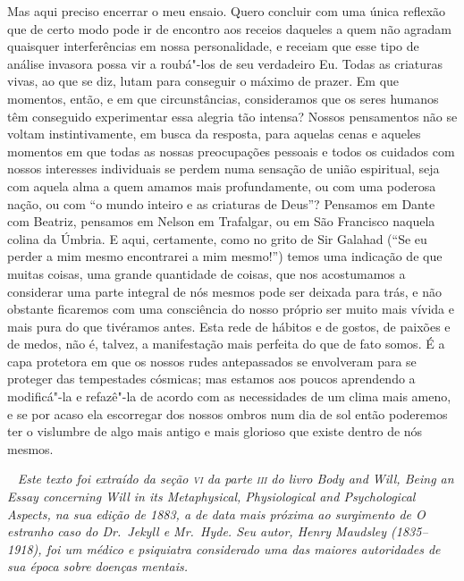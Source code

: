 Mas aqui preciso encerrar o meu ensaio.  Quero concluir com uma única
reflexão que de certo modo pode ir de encontro aos receios daqueles a
quem não agradam quaisquer interferências em nossa personalidade, e
receiam que esse tipo de análise invasora possa vir a roubá"-los de seu
verdadeiro Eu.  Todas as criaturas vivas, ao que se diz, lutam para
conseguir o máximo de prazer.  Em que momentos, então, e em que
circunstâncias, consideramos que os seres humanos têm conseguido
experimentar essa alegria tão intensa? Nossos pensamentos não se voltam
instintivamente, em busca da resposta, para aquelas cenas e aqueles
momentos em que todas as nossas preocupações pessoais e todos os
cuidados com nossos interesses individuais se perdem numa sensação de
união espiritual, seja com aquela alma a quem amamos mais
profundamente, ou com uma poderosa nação, ou com “o mundo inteiro e as
criaturas de Deus”?  Pensamos em Dante com Beatriz, pensamos em Nelson
em Trafalgar, ou em São Francisco naquela colina da Úmbria. E aqui,
certamente, como no grito de Sir Galahad (“Se eu perder a mim mesmo
encontrarei a mim mesmo!”) temos uma indicação de que muitas coisas,
uma grande quantidade de coisas, que nos acostumamos a considerar uma
parte integral de nós mesmos pode ser deixada para trás, e não obstante
ficaremos com uma consciência do nosso próprio ser muito mais vívida e
mais pura do que tivéramos antes.  Esta rede de hábitos e de gostos, de
paixões e de medos, não é, talvez, a manifestação mais perfeita do que
de fato somos.  É a capa protetora em que os nossos rudes antepassados
se envolveram para se proteger das tempestades cósmicas; mas estamos
aos poucos aprendendo a modificá"-la e refazê"-la de acordo com as
necessidades de um clima mais ameno, e se por acaso ela escorregar dos
nossos ombros num dia de sol então poderemos ter o vislumbre de algo
mais antigo e mais glorioso que existe dentro de nós mesmos. 




\clearpage
\ifodd\thepage ~ \clearpage\else\relax\fi
\thispagestyle{empty}
\mbox{}\vfill
{\noindent\itshape Este texto foi extraído da seção \emph{\textsc{vi}} da parte 
\emph{\textsc{iii}} do livro \emph{Body and Will, Being an Essay concerning Will 
in its Metaphysical, Physiological and Psychological Aspects}, na 
sua edição de 1883, a de data mais próxima ao surgimento de \emph{O estranho caso 
do Dr.~Jekyll e Mr.~Hyde}. Seu autor, Henry Maudsley (1835--1918),
foi um médico e psiquiatra considerado uma das maiores autoridades de sua época
sobre doenças mentais.}

